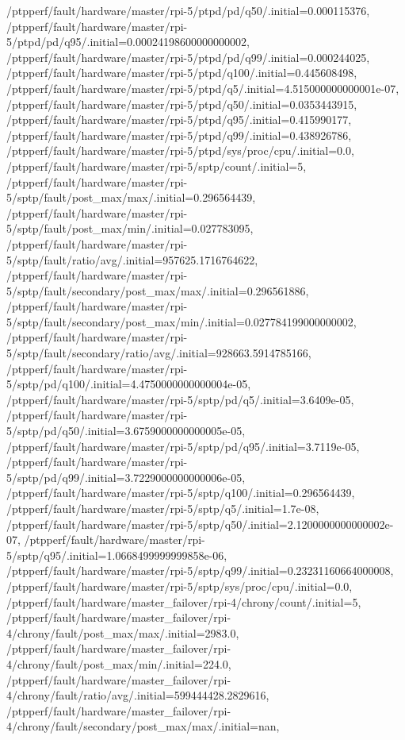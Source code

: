 {    /ptpperf/fault/hardware/master/rpi-5/ptpd/pd/q50/.initial=0.000115376,
    /ptpperf/fault/hardware/master/rpi-5/ptpd/pd/q95/.initial=0.00024198600000000002,
    /ptpperf/fault/hardware/master/rpi-5/ptpd/pd/q99/.initial=0.000244025,
    /ptpperf/fault/hardware/master/rpi-5/ptpd/q100/.initial=0.445608498,
    /ptpperf/fault/hardware/master/rpi-5/ptpd/q5/.initial=4.515000000000001e-07,
    /ptpperf/fault/hardware/master/rpi-5/ptpd/q50/.initial=0.0353443915,
    /ptpperf/fault/hardware/master/rpi-5/ptpd/q95/.initial=0.415990177,
    /ptpperf/fault/hardware/master/rpi-5/ptpd/q99/.initial=0.438926786,
    /ptpperf/fault/hardware/master/rpi-5/ptpd/sys/proc/cpu/.initial=0.0,
    /ptpperf/fault/hardware/master/rpi-5/sptp/count/.initial=5,
    /ptpperf/fault/hardware/master/rpi-5/sptp/fault/post_max/max/.initial=0.296564439,
    /ptpperf/fault/hardware/master/rpi-5/sptp/fault/post_max/min/.initial=0.027783095,
    /ptpperf/fault/hardware/master/rpi-5/sptp/fault/ratio/avg/.initial=957625.1716764622,
    /ptpperf/fault/hardware/master/rpi-5/sptp/fault/secondary/post_max/max/.initial=0.296561886,
    /ptpperf/fault/hardware/master/rpi-5/sptp/fault/secondary/post_max/min/.initial=0.027784199000000002,
    /ptpperf/fault/hardware/master/rpi-5/sptp/fault/secondary/ratio/avg/.initial=928663.5914785166,
    /ptpperf/fault/hardware/master/rpi-5/sptp/pd/q100/.initial=4.4750000000000004e-05,
    /ptpperf/fault/hardware/master/rpi-5/sptp/pd/q5/.initial=3.6409e-05,
    /ptpperf/fault/hardware/master/rpi-5/sptp/pd/q50/.initial=3.6759000000000005e-05,
    /ptpperf/fault/hardware/master/rpi-5/sptp/pd/q95/.initial=3.7119e-05,
    /ptpperf/fault/hardware/master/rpi-5/sptp/pd/q99/.initial=3.7229000000000006e-05,
    /ptpperf/fault/hardware/master/rpi-5/sptp/q100/.initial=0.296564439,
    /ptpperf/fault/hardware/master/rpi-5/sptp/q5/.initial=1.7e-08,
    /ptpperf/fault/hardware/master/rpi-5/sptp/q50/.initial=2.1200000000000002e-07,
    /ptpperf/fault/hardware/master/rpi-5/sptp/q95/.initial=1.0668499999999858e-06,
    /ptpperf/fault/hardware/master/rpi-5/sptp/q99/.initial=0.23231160664000008,
    /ptpperf/fault/hardware/master/rpi-5/sptp/sys/proc/cpu/.initial=0.0,
    /ptpperf/fault/hardware/master_failover/rpi-4/chrony/count/.initial=5,
    /ptpperf/fault/hardware/master_failover/rpi-4/chrony/fault/post_max/max/.initial=2983.0,
    /ptpperf/fault/hardware/master_failover/rpi-4/chrony/fault/post_max/min/.initial=224.0,
    /ptpperf/fault/hardware/master_failover/rpi-4/chrony/fault/ratio/avg/.initial=599444428.2829616,
    /ptpperf/fault/hardware/master_failover/rpi-4/chrony/fault/secondary/post_max/max/.initial=nan,
}
